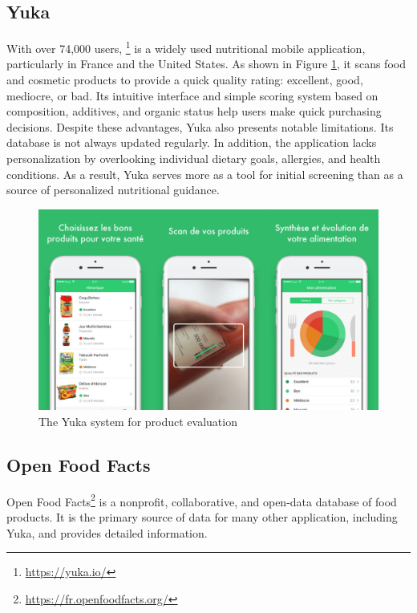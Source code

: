 \subsection{Yuka}
With over 74,000 users, \footnote{\url{https://yuka.io/}} is a widely used nutritional mobile application, particularly in France and the United States. As shown in Figure \ref{fig:yuka_evaluation}, it scans food and cosmetic products to provide a quick quality rating: excellent, good, mediocre, or bad. Its intuitive interface and simple scoring system based on composition, additives, and organic status help users make quick purchasing decisions. 
Despite these advantages, Yuka also presents notable limitations. Its database is not always updated regularly. In addition, the application lacks personalization by overlooking individual dietary goals, allergies, and health conditions. As a result, Yuka serves more as a tool for initial screening than as a source of personalized nutritional guidance.
\begin{center}
\begin{figure}[H]
\includegraphics[scale=0.33]{images/yuka_evaluation.png}
\caption{The Yuka system for product evaluation}
\label{fig:yuka_evaluation}
\end{figure}
\end{center}

\subsection{ Open Food Facts}
Open Food Facts\footnote{\url{https://fr.openfoodfacts.org/}} is a nonprofit, collaborative, and open-data database of food products. It is the primary source of data for many other application, including Yuka, and provides detailed information. 

